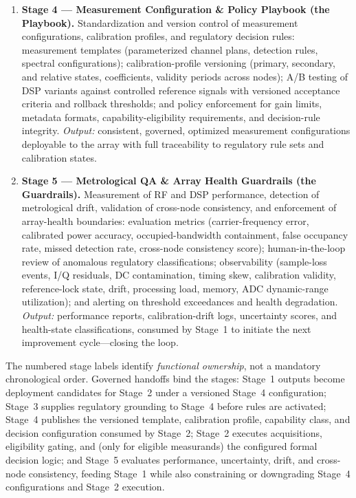 \documentclass[11pt,a4paper]{article}
\begin{document}
\begin{enumerate}
    (jurisdiction, competent authority, service, station, effective date, source version,
    precedence rule); historical spectrum embeddings for trend comparison and anomaly
    fingerprinting; and knowledge graphs of station relationships, propagation characteristics,
    array topology, and inter-node calibration histories. \emph{Output:} contextual regulatory
    grounding and versioned measurand-specific decision definitions (rule type, limits or
    permitted region, reference quantities, rule parameters, regulatory source).
  \item \textbf{Stage 4 --- Measurement Configuration \& Policy Playbook (the Playbook).}
    Standardization and version control of measurement configurations, calibration profiles, and
    regulatory decision rules: measurement templates (parameterized channel plans, detection
    rules, spectral configurations); calibration-profile versioning (primary, secondary, and
    relative states, coefficients, validity periods across nodes); A/B testing of DSP variants
    against controlled reference signals with versioned acceptance criteria and rollback
    thresholds; and policy enforcement for gain limits, metadata formats, capability-eligibility
    requirements, and decision-rule integrity. \emph{Output:} consistent, governed, optimized
    measurement configurations deployable to the array with full traceability to regulatory rule
    sets and calibration states.
  \item \textbf{Stage 5 --- Metrological QA \& Array Health Guardrails (the Guardrails).}
    Measurement of RF and DSP performance, detection of metrological drift, validation of
    cross-node consistency, and enforcement of array-health boundaries: evaluation metrics
    (carrier-frequency error, calibrated power accuracy, occupied-bandwidth containment, false
    occupancy rate, missed detection rate, cross-node consistency score); human-in-the-loop
    review of anomalous regulatory classifications; observability (sample-loss events, I/Q
    residuals, DC contamination, timing skew, calibration validity, reference-lock state, drift,
    processing load, memory, ADC dynamic-range utilization); and alerting on threshold
    exceedances and health degradation. \emph{Output:} performance reports, calibration-drift
    logs, uncertainty scores, and health-state classifications, consumed by Stage~1 to initiate
    the next improvement cycle---closing the loop.
\end{enumerate}

The numbered stage labels identify \emph{functional ownership}, not a mandatory chronological
order. Governed handoffs bind the stages: Stage~1 outputs become deployment candidates for
Stage~2 under a versioned Stage~4 configuration; Stage~3 supplies regulatory grounding to Stage~4
before rules are activated; Stage~4 publishes the versioned template, calibration profile,
capability class, and decision configuration consumed by Stage~2; Stage~2 executes acquisitions,
eligibility gating, and (only for eligible measurands) the configured formal decision logic; and
Stage~5 evaluates performance, uncertainty, drift, and cross-node consistency, feeding Stage~1
while also constraining or downgrading Stage~4 configurations and Stage~2 execution.
\end{document}
